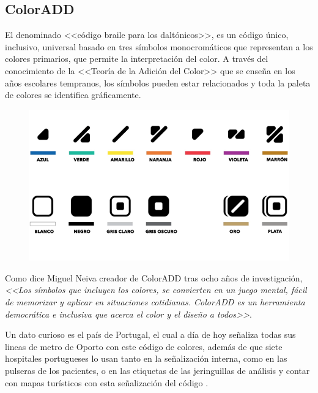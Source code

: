 \documentclass[10pt]{article}
\begin{document}
\subsection{ColorADD}

El denominado <<código braile para los daltónicos>>, es un código único, inclusivo, universal basado en tres símbolos monocromáticos que representan a los colores primarios, que permite la interpretación del color. A través del conocimiento de la <<Teoría de la Adición del Color>> que se enseña en los años escolares tempranos, los símbolos pueden estar relacionados y toda la paleta de colores se identifica gráficamente\cite{IEEEreferencias:Ref17}.
\newline
\begin{figure}[H]
	\begin{center}
\includegraphics[scale = 0.65]{Imagenes/coloradd.PNG}
	\end{center} 
\end{figure}

Como dice Miguel Neiva creador de ColorADD tras ocho años de investigación, \textit{<<Los símbolos que incluyen los colores, se convierten en un juego mental, fácil de memorizar y aplicar en situaciones cotidianas. ColorADD es un herramienta democrática e inclusiva que acerca el color y el diseño a todos>>}\cite{IEEEreferencias:Ref17}. \newline

Un dato curioso es el país de Portugal, el cual a día de hoy señaliza todas sus lineas de metro de Oporto con este código de colores, además de que siete hospitales portugueses lo usan tanto en la señalización interna, como en las pulseras de los pacientes, o en las etiquetas de las jeringuillas de análisis y contar con mapas turísticos con esta señalización del código \cite{IEEEreferencias:Ref17}.
\end{document}
